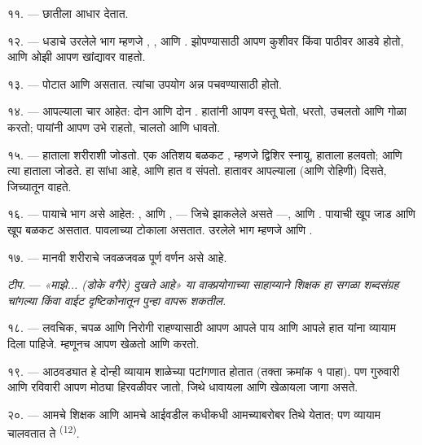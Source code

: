 ११. ---  छातीला आधार देतात.

१२. --- धडाचे उरलेले भाग म्हणजे , ,  आणि
. झोपण्यासाठी आपण कुशीवर किंवा पाठीवर आडवे होतो, आणि ओझी आपण
खांद्यावर वाहतो.

१३. --- पोटात  आणि  असतात. त्यांचा उपयोग अन्न पचवण्यासाठी
होतो.

\VUsaut{4.4mm}
\VUsaut{3.0mm}

१४. --- आपल्याला चार  आहेत: दोन  आणि दोन .
हातांनी आपण वस्तू घेतो, धरतो, उचलतो आणि गोळा करतो; पायांनी आपण उभे राहतो,
चालतो आणि धावतो.

१५. ---  हाताला शरीराशी जोडतो. एक अतिशय बळकट ,
म्हणजे द्विशिर स्नायू, हाताला हलवतो; आणि  त्या हाताला
 जोडते.  हा  सांधा आहे, आणि हात
 व  संपतो. हातावर आपल्याला  (आणि
रोहिणी) दिसते, जिच्यातून  वाहते.

१६. --- पायाचे भाग असे आहेत: ,  आणि
,  --- जिचे 
 झाकलेले असते ---,  आणि . पायाची
 खूप जाड आणि खूप बळकट असतात. पावलाच्या टोकाला 
असतात. उरलेले भाग म्हणजे  आणि .

१७. --- मानवी शरीराचे जवळजवळ पूर्ण वर्णन असे आहे.

\textit{टीप.} --- \textit{«माझे... (डोके वगैरे) दुखते आहे» या वाक्प्रयोगाच्या
साहाय्याने शिक्षक हा सगळा शब्दसंग्रह चांगल्या किंवा वाईट} 
\textit{दृष्टिकोनातून पुन्हा वापरू शकतील.}

\VUsaut{5.0mm}
\VUsaut{2.4mm}
\VUsaut{3.0mm}

१८. --- लवचिक, चपळ आणि निरोगी राहण्यासाठी आपण आपले पाय आणि आपले हात यांना
व्यायाम दिला पाहिजे. म्हणूनच आपण खेळतो आणि  करतो.

१९. --- आठवड्यात हे दोन्ही व्यायाम शाळेच्या पटांगणात होतात (तक्ता क्रमांक १
पाहा). पण गुरुवारी आणि रविवारी आपण मोठ्या हिरवळीवर जातो, जिथे धावायला आणि
खेळायला जागा असते.

२०. --- आमचे शिक्षक आणि आमचे आईवडील कधीकधी आमच्याबरोबर तिथे येतात; पण व्यायाम
चालवतात ते \textsuperscript{(12)}.

